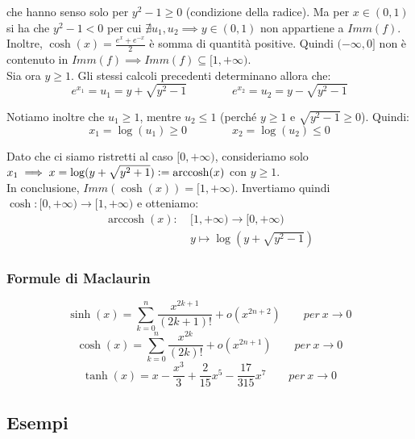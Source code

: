\documentclass{article}
\DeclareMathOperator{\arccosh}{arccosh}
\begin{document}
\noindent che hanno senso solo per $y^2 - 1 \geq 0$ (condizione della radice). Ma per $x \in (0, 1)$ si ha che $y^2 - 1 < 0$ per cui $\nexists u_1, u_2 \implies y \in (0, 1)$ non appartiene a $Imm(f)$. Inoltre, $\cosh(x) = \frac{e^x + e^{-x}}{2}$ è somma di quantità positive. Quindi $(-\infty, 0]$ non è contenuto in $Imm(f) \implies Imm(f) \subseteq [1, +\infty)$. \\
Sia ora $y \geq 1$. Gli stessi calcoli precedenti determinano allora che:
\begin{equation*}
    e^{x_1} = u_1 = y + \sqrt{y^2 - 1} \qquad \qquad e^{x_2} = u_2 = y - \sqrt{y^2 - 1}
\end{equation*}

\noindent Notiamo inoltre che $u_1 \geq 1$, mentre $u_2 \leq 1$ (perché $y \geq 1$ e $\sqrt{y^2 - 1} \geq 0$). Quindi:
\begin{equation*}
    x_1 = \log(u_1) \geq 0 \qquad \qquad x_2 = \log(u_2) \leq 0
\end{equation*}

\noindent Dato che ci siamo ristretti al caso $[0, +\infty)$, consideriamo solo $x_1 \implies x = \log(y + \sqrt{y^2 + 1}) \vcentcolon = \arccosh(x)$ con $y \geq 1$.\\
In conclusione, $Imm(\cosh(x)) = [1, +\infty)$. Invertiamo quindi $\cosh: [0, +\infty) \xrightarrow{} [1, +\infty)$ e otteniamo:
\begin{align*}
    \arccosh(x): \ & [1, +\infty) \xrightarrow{} [0, +\infty) \\
    & y \longmapsto  \log(y + \sqrt{y^2 - 1})
\end{align*}

\subsubsection{Formule di Maclaurin}
\begin{equation*}
    \sinh(x) = \sum_{k = 0}^n \frac{x^{2k + 1}}{(2k + 1)!} + o(x^{2n + 2}) \qquad per \ x \to 0
\end{equation*}
\begin{equation*}
    \cosh(x) = \sum_{k = 0}^n \frac{x^{2k}}{(2k)!} + o(x^{2n + 1}) \qquad per \ x \to 0
\end{equation*}
\begin{equation*}
    \tanh(x) = x - \frac{x^3}{3} + \frac{2}{15} x^5 - \frac{17}{315} x^7 \qquad per \ x \to 0
\end{equation*}

\subsection{Esempi}
\end{document}
